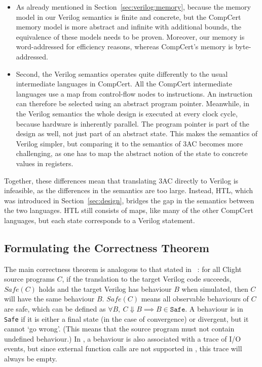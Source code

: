 \begin{itemize}
\item As already mentioned in Section~\ref{sec:verilog:memory}, because the
  memory model in our Verilog semantics is finite and concrete, but the CompCert
  memory model is more abstract and infinite with additional bounds, the
  equivalence of these models needs to be proven.  Moreover, our memory is
  word-addressed for efficiency reasons, whereas CompCert's memory is
  byte-addressed.

\item Second, the Verilog semantics operates quite differently to the usual
  intermediate languages in CompCert.  All the CompCert intermediate languages
  use a map from control-flow nodes to instructions.  An instruction can
  therefore be selected using an abstract program pointer. Meanwhile, in the
  Verilog semantics the whole design is executed at every clock cycle, because
  hardware is inherently parallel. The program pointer is part of the design as
  well, not just part of an abstract state. This makes the semantics of Verilog
  simpler, but comparing it to the semantics of 3AC becomes more challenging, as
  one has to map the abstract notion of the state to concrete values in
  registers.
\end{itemize}

Together, these differences mean that translating 3AC directly to Verilog is
infeasible, as the differences in the semantics are too large.  Instead, HTL,
which was introduced in Section~\ref{sec:design}, bridges the gap in the
semantics between the two languages.  HTL still consists of maps, like many of
the other CompCert languages, but each state corresponds to a Verilog statement.

\subsection{Formulating the Correctness Theorem}

The main correctness theorem is analogous to that stated in
\compcert{}~\cite{leroy09_formal_verif_realis_compil}: for all Clight source
programs $C$, if the translation to the target Verilog code succeeds,
$\mathit{Safe}(C)$ holds and the target Verilog has behaviour $B$ when
simulated, then $C$ will have the same behaviour $B$. $\mathit{Safe}(C)$ means
all observable behaviours of $C$ are safe, which can be defined as
$\forall B,\ C \Downarrow B \implies B \in \texttt{Safe}$.  A behaviour is in
\texttt{Safe} if it is either a final state (in the case of convergence) or
divergent, but it cannot `go wrong'. (This means that the source program must
not contain undefined behaviour.) In \compcert{}, a behaviour is also associated
with a trace of I/O events, but since external function calls are not supported
in \vericert{}, this trace will always be empty.

